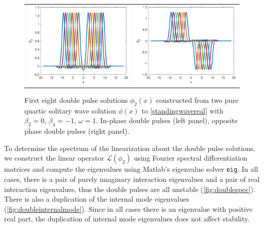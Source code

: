 \documentclass[12pt]{article}
\def\calL{{\mathcal L}}
\begin{document}
\begin{figure}[H]
\centering
\begin{tabular}{cc}
\includegraphics[width=8cm]{images/DPplus.eps} &
\includegraphics[width=8cm]{images/DPminus.eps}
\end{tabular}
\caption{First eight double pulse solutions $\phi_2(x)$ constructed from two pure quartic solitary wave solution $\phi(x)$ to \cref{standingwavereal} with $\beta_2 = 0$, $\beta_4 = -1$, $\omega = 1$. In-phase double pulses (left panel), opposite phase double pulses (right panel). }
\label{fig:doublepulses}
\end{figure} 

To determine the spectrum of the linearization about the double pulse solutions, we construct the linear operator $\calL(\phi_2)$ using Fourier spectral differentiation matrices and compute the eigenvalues using Matlab's eigenvalue solver \texttt{eig}. In all cases, there is a pair of purely imaginary interaction eigenvalues and a pair of real interaction eigenvalues, thus the double pulses are all unstable (\cref{fig:doublespec}). There is also a duplication of the internal mode eigenvalues (\cref{fig:doubleinternalmode}). Since in all cases there is an eigenvalue with positive real part, the duplication of internal mode eigenvalues does not affect stability. 
\end{document}
